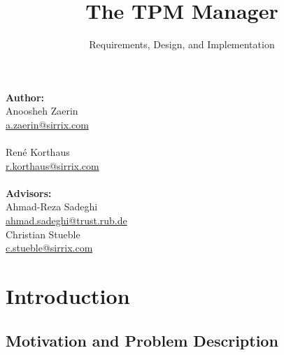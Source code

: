 \documentclass[
  american        %
]{sirrixreport}
\title{The TPM Manager}
\subtitle{Requirements, Design, and Implementation}
\begin{document}
\maketitle		%
\cleardoublepage        %

\begin{table}
{\large \textbf{Author:}}\\

Anoosheh Zaerin\\
\url{a.zaerin@sirrix.com} \\
\\
Ren\'e Korthaus\\
\url{r.korthaus@sirrix.com} \\
\\
{\large \textbf{Advisors:}} \\

              Ahmad-Reza Sadeghi \\
             \url{ahmad.sadeghi@trust.rub.de} \\

 Christian Stueble \\
             \url{c.stueble@sirrix.com}

\end{table}



\tableofcontents	%
\listoffigures

\lstset{language=C++,
        basicstyle=\small,
   commentstyle=\itshape,
   identifierstyle=\ttfamily,
   keywordstyle=\ttfamily,
   stringstyle=\ttfamily
}


\chapter{Introduction}
\label{chap:usingclassfile}

\section{Motivation and Problem Description}
\label{sec:motivation}
\end{document}
